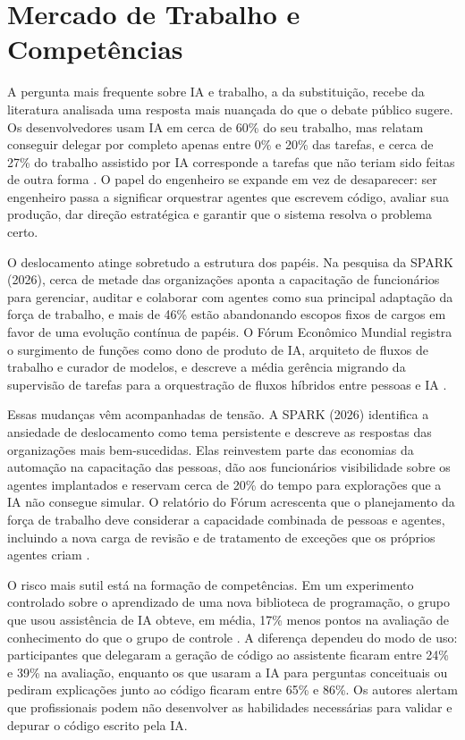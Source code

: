 \section{Mercado de Trabalho e Competências}\label{sec:2.5}

A pergunta mais frequente sobre IA e trabalho, a da substituição, recebe da literatura analisada uma resposta mais nuançada do que o debate público sugere. Os desenvolvedores usam IA em cerca de 60\% do seu trabalho, mas relatam conseguir delegar por completo apenas entre 0\% e 20\% das tarefas, e cerca de 27\% do trabalho assistido por IA corresponde a tarefas que não teriam sido feitas de outra forma \cite{anthropic2026trends}. O papel do engenheiro se expande em vez de desaparecer: ser engenheiro passa a significar orquestrar agentes que escrevem código, avaliar sua produção, dar direção estratégica e garantir que o sistema resolva o problema certo.

O deslocamento atinge sobretudo a estrutura dos papéis. Na pesquisa da SPARK (2026)\nocite{spark2026cio}, cerca de metade das organizações aponta a capacitação de funcionários para gerenciar, auditar e colaborar com agentes como sua principal adaptação da força de trabalho, e mais de 46\% estão abandonando escopos fixos de cargos em favor de uma evolução contínua de papéis. O Fórum Econômico Mundial registra o surgimento de funções como dono de produto de IA, arquiteto de fluxos de trabalho e curador de modelos, e descreve a média gerência migrando da supervisão de tarefas para a orquestração de fluxos híbridos entre pessoas e IA \cite{wef2026organizational}.

Essas mudanças vêm acompanhadas de tensão. A SPARK (2026)\nocite{spark2026cio} identifica a ansiedade de deslocamento como tema persistente e descreve as respostas das organizações mais bem-sucedidas. Elas reinvestem parte das economias da automação na capacitação das pessoas, dão aos funcionários visibilidade sobre os agentes implantados e reservam cerca de 20\% do tempo para explorações que a IA não consegue simular. O relatório do Fórum acrescenta que o planejamento da força de trabalho deve considerar a capacidade combinada de pessoas e agentes, incluindo a nova carga de revisão e de tratamento de exceções que os próprios agentes criam \cite{wef2026organizational}.

O risco mais sutil está na formação de competências. Em um experimento controlado sobre o aprendizado de uma nova biblioteca de programação, o grupo que usou assistência de IA obteve, em média, 17\% menos pontos na avaliação de conhecimento do que o grupo de controle \cite{shen2026skill}. A diferença dependeu do modo de uso: participantes que delegaram a geração de código ao assistente ficaram entre 24\% e 39\% na avaliação, enquanto os que usaram a IA para perguntas conceituais ou pediram explicações junto ao código ficaram entre 65\% e 86\%. Os autores alertam que profissionais podem não desenvolver as habilidades necessárias para validar e depurar o código escrito pela IA.

